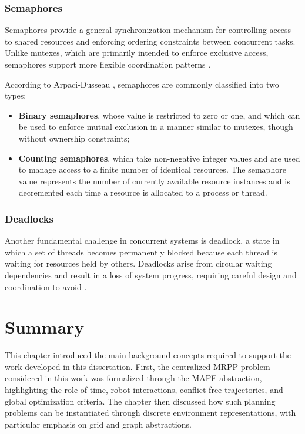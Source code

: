 \subsubsection{Semaphores}
\hspace{\parindent}
Semaphores provide a general synchronization mechanism for controlling access to shared resources
and enforcing ordering constraints between concurrent tasks. Unlike mutexes, which are primarily
intended to enforce exclusive access, semaphores support more flexible coordination patterns
\cite{dijkstra1968cooperating}.

According to Arpaci-Dusseau \cite{arpaci2018operating}, semaphores are commonly
classified into two types:
\begin{itemize}
    \item \textbf{Binary semaphores}, whose value is restricted to zero or one, and which can be
    used to enforce mutual exclusion in a manner similar to mutexes, though without ownership
    constraints;
\item \textbf{Counting semaphores}, which take non-negative integer values and are used to
manage access to a finite number of identical resources. The semaphore value represents the
number of currently available resource instances and is decremented each time a resource is
allocated to a process or thread.

\end{itemize}


\subsubsection{Deadlocks}
\hspace{\parindent}
Another fundamental challenge in concurrent systems is deadlock, a state in which a set
of threads becomes permanently blocked because each thread is waiting for resources held by
others. Deadlocks arise from circular waiting dependencies and result in a loss of system
progress, requiring careful design and coordination to avoid
\cite{silberschatz2018operating}.





\section{Summary}
\hspace{\parindent}
This chapter introduced the main background concepts required to support the work developed in this
dissertation. First, the centralized MRPP problem considered in this work was formalized through
the MAPF abstraction, highlighting the role of time, robot interactions, conflict-free trajectories,
and global optimization criteria. The chapter then discussed how such planning problems can be
instantiated through discrete environment representations, with particular emphasis on grid and
graph abstractions.

